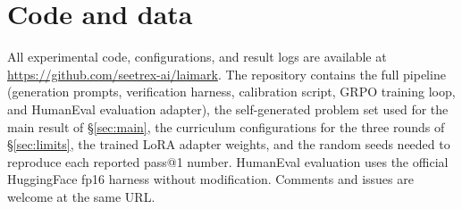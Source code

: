\documentclass[11pt,a4paper]{article}
\begin{document}
\section*{Code and data}

All experimental code, configurations, and result logs are available at
\url{https://github.com/seetrex-ai/laimark}.
The repository contains the full pipeline (generation prompts, verification harness, calibration script, GRPO training loop, and HumanEval evaluation adapter), the self-generated problem set used for the main result of \S\ref{sec:main}, the curriculum configurations for the three rounds of \S\ref{sec:limits}, the trained LoRA adapter weights, and the random seeds needed to reproduce each reported pass@1 number.
HumanEval evaluation uses the official HuggingFace fp16 harness without modification.
Comments and issues are welcome at the same URL.



\end{document}
